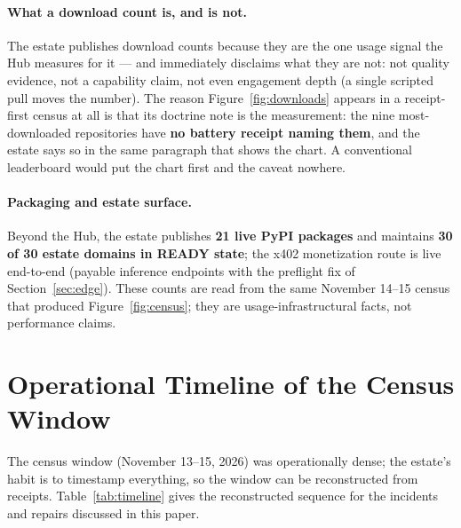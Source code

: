 ﻿\documentclass[11pt]{article}
\begin{document}
\paragraph{What a download count is, and is not.} The estate publishes download counts because they are the one usage signal the Hub measures for it --- and immediately disclaims what they are not: not quality evidence, not a capability claim, not even engagement depth (a single scripted pull moves the number). The reason Figure~\ref{fig:downloads} appears in a receipt-first census at all is that its doctrine note is the measurement: the nine most-downloaded repositories have \textbf{no battery receipt naming them}, and the estate says so in the same paragraph that shows the chart. A conventional leaderboard would put the chart first and the caveat nowhere.

\paragraph{Packaging and estate surface.} Beyond the Hub, the estate publishes \textbf{21 live PyPI packages} and maintains \textbf{30 of 30 estate domains in READY state}; the x402 monetization route is live end-to-end (payable inference endpoints with the preflight fix of Section~\ref{sec:edge}). These counts are read from the same November 14--15 census that produced Figure~\ref{fig:census}; they are usage-infrastructural facts, not performance claims.

\section{Operational Timeline of the Census Window}
\label{sec:timeline}

The census window (November 13--15, 2026) was operationally dense; the estate's habit is to timestamp everything, so the window can be reconstructed from receipts. Table~\ref{tab:timeline} gives the reconstructed sequence for the incidents and repairs discussed in this paper.
\end{document}
